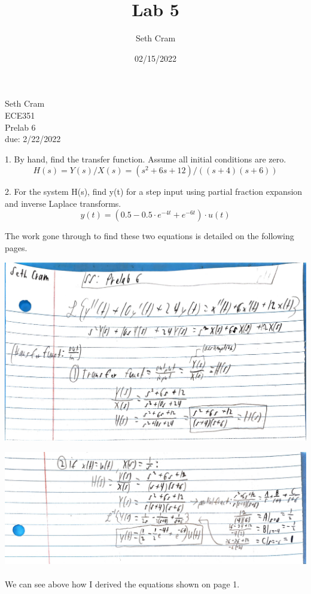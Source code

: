 \documentclass[12pt]{report}
\title{Lab 5}		%
\author{ Seth Cram}
\date{02/15/2022}
\begin{document}




\renewcommand{\thesection}{\arabic{section}}

Seth Cram \\
ECE351 \\
Prelab 6\\ 
due: 2/22/2022
 
 1. By hand, find the transfer function. Assume all initial conditions are zero. \\
    \begin{equation*}
        H(s) = Y(s)/X(s) = (s^2+6s+12)/((s+4)(s+6))
    \end{equation*}

2. For the system H(s), find y(t) for a step input using partial fraction expansion and inverse
Laplace transforms.
    \begin{equation*}
        y(t) = (0.5 - 0.5 \cdot e^{-4t} + e^{-6t}) \cdot u(t)
    \end{equation*}

    The work gone through to find these two equations is detailed on the following pages.

\newpage


    \includegraphics[scale = 0.1]{8283DE04-59E7-407A-96C0-75A20A362B8B.jpeg}

    \includegraphics[scale = 0.1]{E6102702-450E-4D2E-81AD-9F1A6F712BC5.jpeg}


    \paragraph{} We can see above how I derived the equations shown on page 1.  
\end{document}
